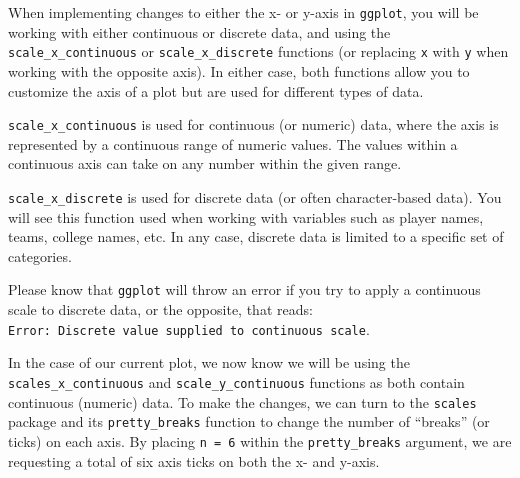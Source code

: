 \documentclass[
  letterpaper,
]{krantz}
\begin{document}
\begin{tcolorbox}[enhanced jigsaw, colback=white, leftrule=.75mm, breakable, colframe=quarto-callout-important-color-frame, bottomtitle=1mm, rightrule=.15mm, left=2mm, opacityback=0, bottomrule=.15mm, arc=.35mm, coltitle=black, colbacktitle=quarto-callout-important-color!10!white, toptitle=1mm, titlerule=0mm, title=\textcolor{quarto-callout-important-color}{\faExclamation}\hspace{0.5em}{Important}, toprule=.15mm, opacitybacktitle=0.6]

When implementing changes to either the x- or y-axis in \texttt{ggplot},
you will be working with either continuous or discrete data, and using
the \texttt{scale\_x\_continuous} or \texttt{scale\_x\_discrete}
functions (or replacing \texttt{x} with \texttt{y} when working with the
opposite axis). In either case, both functions allow you to customize
the axis of a plot but are used for different types of data.

\texttt{scale\_x\_continuous} is used for continuous (or numeric) data,
where the axis is represented by a continuous range of numeric values.
The values within a continuous axis can take on any number within the
given range.

\texttt{scale\_x\_discrete} is used for discrete data (or often
character-based data). You will see this function used when working with
variables such as player names, teams, college names, etc. In any case,
discrete data is limited to a specific set of categories.

Please know that \texttt{ggplot} will throw an error if you try to apply
a continuous scale to discrete data, or the opposite, that reads:
\texttt{Error:\ Discrete\ value\ supplied\ to\ continuous\ scale}.

\end{tcolorbox}

In the case of our current plot, we now know we will be using the
\texttt{scales\_x\_continuous} and \texttt{scale\_y\_continuous}
functions as both contain continuous (numeric) data. To make the
changes, we can turn to the \texttt{scales} package and its
\texttt{pretty\_breaks} function to change the number of ``breaks'' (or
ticks) on each axis. By placing \texttt{n\ =\ 6} within the
\texttt{pretty\_breaks} argument, we are requesting a total of six axis
ticks on both the x- and y-axis.
\end{document}
